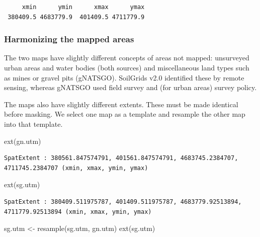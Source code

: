 \documentclass[
  letterpaper,
  DIV=11,
  numbers=noendperiod]{scrartcl}
\newenvironment{Shaded}{\begin{snugshade}}{\end{snugshade}}
\newcommand{\FunctionTok}[1]{\textcolor[rgb]{0.28,0.35,0.67}{#1}}
\newcommand{\NormalTok}[1]{\textcolor[rgb]{0.00,0.23,0.31}{#1}}
\newcommand{\OtherTok}[1]{\textcolor[rgb]{0.00,0.23,0.31}{#1}}
\begin{document}
\begin{verbatim}
     xmin      ymin      xmax      ymax 
 380409.5 4683779.9  401409.5 4711779.9 
\end{verbatim}

\hypertarget{harmonizing-the-mapped-areas}{%
\subsubsection{Harmonizing the mapped
areas}\label{harmonizing-the-mapped-areas}}

The two maps have slightly different concepts of areas not mapped:
unsurveyed urban areas and water bodies (both sources) and miscellaneous
land types such as mines or gravel pits (gNATSGO). SoilGrids v2.0
identified these by remote sensing, whereas gNATSGO used field survey
and (for urban areas) survey policy.

The maps also have slightly different extents. These must be made
identical before masking. We select one map as a template and resample
the other map into that template.

\begin{Shaded}
\begin{Highlighting}[]
\FunctionTok{ext}\NormalTok{(gn.utm)}
\end{Highlighting}
\end{Shaded}

\begin{verbatim}
SpatExtent : 380561.847574791, 401561.847574791, 4683745.2384707, 4711745.2384707 (xmin, xmax, ymin, ymax)
\end{verbatim}

\begin{Shaded}
\begin{Highlighting}[]
\FunctionTok{ext}\NormalTok{(sg.utm)}
\end{Highlighting}
\end{Shaded}

\begin{verbatim}
SpatExtent : 380409.511975787, 401409.511975787, 4683779.92513894, 4711779.92513894 (xmin, xmax, ymin, ymax)
\end{verbatim}

\begin{Shaded}
\begin{Highlighting}[]
\NormalTok{sg.utm }\OtherTok{\textless{}{-}} \FunctionTok{resample}\NormalTok{(sg.utm, gn.utm)}
\FunctionTok{ext}\NormalTok{(sg.utm)}
\end{Highlighting}
\end{Shaded}
\end{document}
